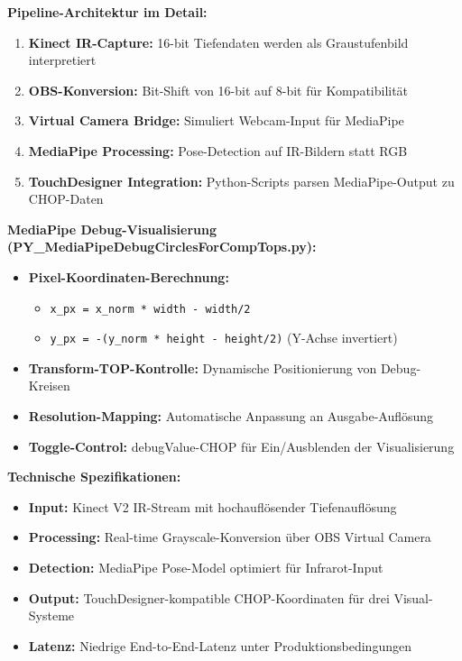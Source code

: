 \textbf{Pipeline-Architektur im Detail:}
\begin{enumerate}
    \item \textbf{Kinect IR-Capture:} 16-bit Tiefendaten werden als Graustufenbild interpretiert
    \item \textbf{OBS-Konversion:} Bit-Shift von 16-bit auf 8-bit für Kompatibilität
    \item \textbf{Virtual Camera Bridge:} Simuliert Webcam-Input für MediaPipe
    \item \textbf{MediaPipe Processing:} Pose-Detection auf IR-Bildern statt RGB
    \item \textbf{TouchDesigner Integration:} Python-Scripts parsen MediaPipe-Output zu CHOP-Daten
\end{enumerate}

\textbf{MediaPipe Debug-Visualisierung (PY\_MediaPipeDebugCirclesForCompTops.py):}
\begin{itemize}
    \item \textbf{Pixel-Koordinaten-Berechnung:} 
    \begin{itemize}
        \item \texttt{x\_px = x\_norm * width - width/2}
        \item \texttt{y\_px = -(y\_norm * height - height/2)} (Y-Achse invertiert)
    \end{itemize}
    \item \textbf{Transform-TOP-Kontrolle:} Dynamische Positionierung von Debug-Kreisen
    \item \textbf{Resolution-Mapping:} Automatische Anpassung an Ausgabe-Auflösung
    \item \textbf{Toggle-Control:} debugValue-CHOP für Ein/Ausblenden der Visualisierung
\end{itemize}

\textbf{Technische Spezifikationen:}
\begin{itemize}
    \item \textbf{Input:} Kinect V2 IR-Stream mit hochauflösender Tiefenauflösung
    \item \textbf{Processing:} Real-time Grayscale-Konversion über OBS Virtual Camera
    \item \textbf{Detection:} MediaPipe Pose-Model optimiert für Infrarot-Input
    \item \textbf{Output:} TouchDesigner-kompatible CHOP-Koordinaten für drei Visual-Systeme
    \item \textbf{Latenz:} Niedrige End-to-End-Latenz unter Produktionsbedingungen
\end{itemize}

